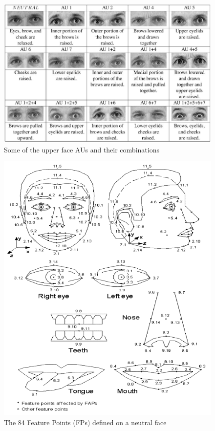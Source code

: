 \documentclass[11pt]{article}
\begin{document}
\begin{figure}[!h]
   	\centerline{\includegraphics[scale=0.4]{./images/facs}}
   	\caption{\label{Figure FACs} Some of the upper face AUs and their combinations \cite{Tian01}}
\end{figure}
\begin{figure}[!h]
   	\centerline{\includegraphics[scale=0.45]{./images/mpeg4}}
   	\caption{\label{Figure FAPs} The 84 Feature Points (FPs) defined on a neutral face \cite{Pandzic03}}
\end{figure}
\end{document}
